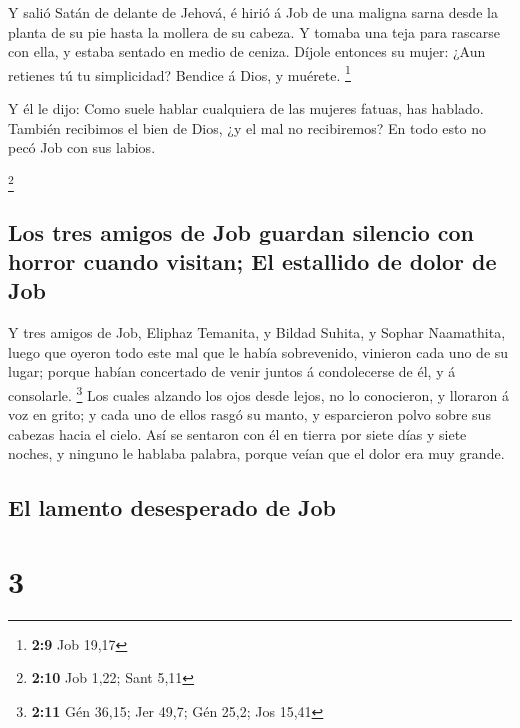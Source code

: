  Y salió Satán de delante de Jehová, é hirió á Job de una
maligna sarna desde la planta de su pie hasta la mollera de su cabeza.
 Y tomaba una teja para rascarse con ella, y estaba sentado
en medio de ceniza.  Díjole entonces su mujer: ¿Aun retienes
tú tu simplicidad? Bendice á Dios, y muérete. \footnote{\textbf{2:9} Job
  19,17}

 Y él le dijo: Como suele hablar cualquiera de las mujeres
fatuas, has hablado. También recibimos el bien de Dios, ¿y el mal no
recibiremos? En todo esto no pecó Job con sus labios.

\footnote{\textbf{2:10} Job 1,22; Sant 5,11}

\hypertarget{los-tres-amigos-de-job-guardan-silencio-con-horror-cuando-visitan-el-estallido-de-dolor-de-job}{%
\subsection{Los tres amigos de Job guardan silencio con horror cuando
visitan; El estallido de dolor de
Job}\label{los-tres-amigos-de-job-guardan-silencio-con-horror-cuando-visitan-el-estallido-de-dolor-de-job}}

 Y tres amigos de Job, Eliphaz Temanita, y Bildad Suhita, y
Sophar Naamathita, luego que oyeron todo este mal que le había
sobrevenido, vinieron cada uno de su lugar; porque habían concertado de
venir juntos á condolecerse de él, y á consolarle. \footnote{\textbf{2:11}
  Gén 36,15; Jer 49,7; Gén 25,2; Jos 15,41}  Los cuales
alzando los ojos desde lejos, no lo conocieron, y lloraron á voz en
grito; y cada uno de ellos rasgó su manto, y esparcieron polvo sobre sus
cabezas hacia el cielo.  Así se sentaron con él en tierra
por siete días y siete noches, y ninguno le hablaba palabra, porque
veían que el dolor era muy grande.

\hypertarget{el-lamento-desesperado-de-job}{%
\subsection{El lamento desesperado de
Job}\label{el-lamento-desesperado-de-job}}

\hypertarget{section-2}{%
\section{3}\label{section-2}}

